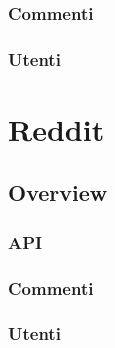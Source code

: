 \subsubsection {Commenti}
\subsubsection {Utenti}



\section {Reddit} %

\subsection {Overview}
\subsubsection {API}

\subsubsection {Commenti}
\subsubsection {Utenti}



